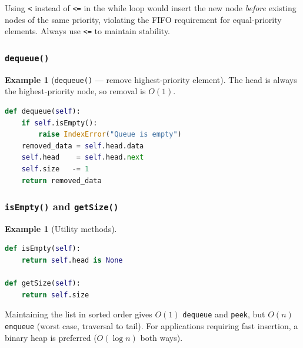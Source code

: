 \documentclass[11pt, a4paper, notitlepage]{report}
\theoremstyle{definition}
\theoremstyle{remark}
\theoremstyle{definition}
\newtheorem{example}[theorem]{Example}
\begin{document}
\begin{warning}[title={Warning: \texttt{<=} vs.\ \texttt{<} in the while condition}]
Using \texttt{<} instead of \texttt{<=} in the while loop would insert the new node
\emph{before} existing nodes of the same priority, violating the FIFO requirement for
equal-priority elements.  Always use \texttt{<=} to maintain stability.
\end{warning}

\subsubsection{\texttt{dequeue()}}
\label{subsubsec:pq-dequeue}

\begin{example}[\texttt{dequeue()} --- remove highest-priority element]
\label{ex:pq-dequeue}
The head is always the highest-priority node, so removal is $O(1)$.
\begin{lstlisting}[language=Python]
def dequeue(self):
    if self.isEmpty():
        raise IndexError("Queue is empty")
    removed_data = self.head.data
    self.head    = self.head.next
    self.size   -= 1
    return removed_data
\end{lstlisting}
\end{example}

\subsubsection{\texttt{isEmpty()} and \texttt{getSize()}}
\label{subsubsec:pq-utils}

\begin{example}[Utility methods]
\label{ex:pq-utils}
\leavevmode
\begin{lstlisting}[language=Python]
def isEmpty(self):
    return self.head is None

def getSize(self):
    return self.size
\end{lstlisting}
\end{example}

\begin{keyresult}[title={Key Result: Priority Queue via Sorted Linked List}]
Maintaining the list in sorted order gives $O(1)$ \texttt{dequeue} and \texttt{peek}, but
$O(n)$ \texttt{enqueue} (worst case, traversal to tail).  For applications requiring fast
insertion, a binary heap is preferred ($O(\log n)$ both ways).
\end{keyresult}

\end{document}
